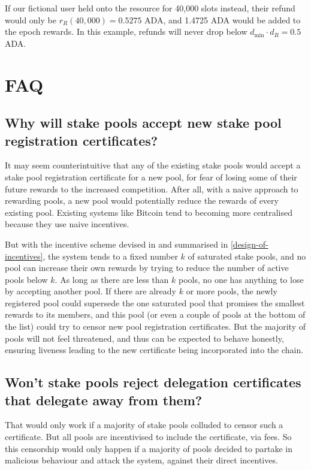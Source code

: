 \documentclass[11pt,a4paper]{article}
\begin{document}
If our fictional user held onto the resource for 40,000 slots instead,
their refund would only be $r_R(40,000)=0.5275$ ADA, and 1.4725 ADA
would be added to the epoch rewards. In this example, refunds will
never drop below $d_{\min}\cdot d_R=0.5$ ADA.


\section{FAQ}

\subsection{Why will stake pools accept new stake pool registration
  certificates?}

It may seem counterintuitive that any of the existing stake pools would accept a
stake pool registration certificate for a new pool, for fear of losing some of
their future rewards to the increased competition. After all, with a naive
approach to rewarding pools, a new pool would potentially reduce the rewards of
every existing pool. Existing systems like Bitcoin tend to becoming more
centralised because they use naive incentives.

But with the incentive scheme devised in \citep{bkks2018} and summarised in
\cref{design-of-incentives}, the system tends to a fixed number \(k\) of
saturated stake pools, and no pool can increase their own rewards by trying to
reduce the number of active pools below \(k\). As long as there are less than
\(k\) pools, no one has anything to lose by accepting another pool. If there are
already \(k\) or more pools, the newly registered pool could supersede the one
saturated pool that promises the smallest rewards to its members, and this pool
(or even a couple of pools at the bottom of the list) could try to censor new
pool registration certificates. But the majority of pools will not feel
threatened, and thus can be expected to behave honestly, ensuring liveness
leading to the new certificate being incorporated into the chain.


\subsection{Won't stake pools reject delegation certificates that delegate away
  from them?}

That would only work if a majority of stake pools colluded to censor such a
certificate. But all pools are incentivised to include the certificate, via
fees. So this censorship would only happen if a majority of pools decided to
partake in malicious behaviour and attack the system, against their direct
incentives.



\end{document}
